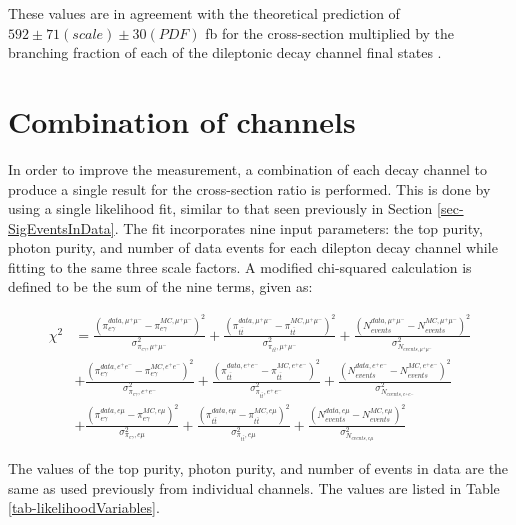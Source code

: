 These values are in agreement with the theoretical prediction of $592 \pm 71 (scale) \pm 30 (PDF)$ fb for the cross-section multiplied by the branching fraction of each of the dileptonic decay channel final states \cite{QCDcorrttgamma}.

\section{Combination of channels} \label{sec-CombinationOfChannels}

In order to improve the measurement, a combination of each decay channel to produce a single result for the cross-section ratio is performed. This is done by using a single likelihood fit, similar to that seen previously in Section \ref{sec-SigEventsInData}. The fit incorporates nine input parameters: the top purity, photon purity, and number of data events for each dilepton decay channel while fitting to the same three scale factors. A modified chi-squared calculation is defined to be the sum of the nine terms, given as:

\begin{equation}
\begin{split}
\chi^2 & = \frac{\left(\pi^{data,\mu^+\mu^-}_{e\gamma} - \pi^{MC,\mu^+\mu^-}_{e\gamma}\right)^2}{\sigma^2_{\pi_{e\gamma},\mu^+\mu^-}} + \frac{\left(\pi^{data,\mu^+\mu^-}_{t\bar{t}} - \pi^{MC,\mu^+\mu^-}_{t\bar{t}}\right)^2}{\sigma^2_{\pi_{t\bar{t}},\mu^+\mu^-}} + \frac{\left(N^{data,\mu^+\mu^-}_{events} - N^{MC,\mu^+\mu^-}_{events}\right)^2}{\sigma^2_{N_{events,\mu^+\mu^-}}} \\
& + \frac{\left(\pi^{data,e^+e^-}_{e\gamma} - \pi^{MC,e^+e^-}_{e\gamma}\right)^2}{\sigma^2_{\pi_{e\gamma},e^+e^-}} + \frac{\left(\pi^{data,e^+e^-}_{t\bar{t}} - \pi^{MC,e^+e^-}_{t\bar{t}}\right)^2}{\sigma^2_{\pi_{t\bar{t}},e^+e^-}} + \frac{\left(N^{data,e^+e^-}_{events} - N^{MC,e^+e^-}_{events}\right)^2}{\sigma^2_{N_{events,e^+e^-}}} \\
& + \frac{\left(\pi^{data,e\mu}_{e\gamma} - \pi^{MC,e\mu}_{e\gamma}\right)^2}{\sigma^2_{\pi_{e\gamma},e\mu}} + \frac{\left(\pi^{data,e\mu}_{t\bar{t}} - \pi^{MC,e\mu}_{t\bar{t}}\right)^2}{\sigma^2_{\pi_{t\bar{t}},e\mu}} + \frac{\left(N^{data,e\mu}_{events} - N^{MC,e\mu}_{events}\right)^2}{\sigma^2_{N_{events,e\mu}}} 
\end{split}
\end{equation}

The values of the top purity, photon purity, and number of events in data are the same as used previously from individual channels. The values are listed in Table \ref{tab-likelihoodVariables}.  

